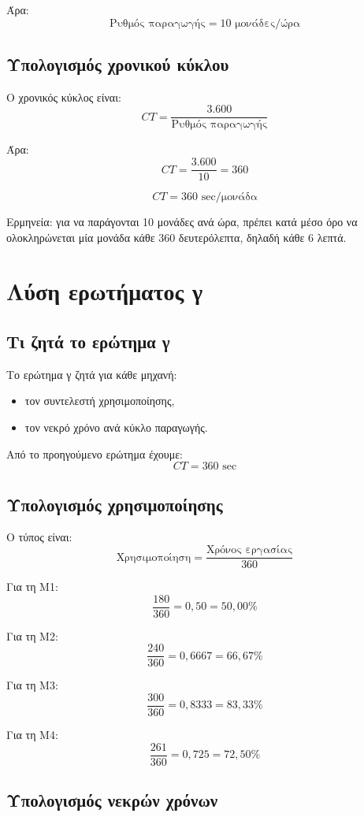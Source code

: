 \documentclass[12pt,a4paper]{article}
\begin{document}
Άρα:
\[
\boxed{\text{Ρυθμός παραγωγής}=10 \text{ μονάδες/ώρα}}
\]

\subsection{Υπολογισμός χρονικού κύκλου}

Ο χρονικός κύκλος είναι:
\[
CT=\frac{3.600}{\text{Ρυθμός παραγωγής}}
\]

Άρα:
\[
CT=\frac{3.600}{10}=360
\]

\[
\boxed{CT=360 \text{ sec/μονάδα}}
\]

Ερμηνεία: για να παράγονται 10 μονάδες ανά ώρα, πρέπει κατά μέσο όρο να ολοκληρώνεται μία μονάδα κάθε 360 δευτερόλεπτα, δηλαδή κάθε 6 λεπτά.

\section{Λύση ερωτήματος γ}

\subsection{Τι ζητά το ερώτημα γ}

Το ερώτημα γ ζητά για κάθε μηχανή:

\begin{itemize}
    \item τον συντελεστή χρησιμοποίησης,
    \item τον νεκρό χρόνο ανά κύκλο παραγωγής.
\end{itemize}

Από το προηγούμενο ερώτημα έχουμε:
\[
CT=360 \text{ sec}
\]

\subsection{Υπολογισμός χρησιμοποίησης}

Ο τύπος είναι:
\[
\text{Χρησιμοποίηση}=
\frac{\text{Χρόνος εργασίας}}{360}
\]

Για τη Μ1:
\[
\frac{180}{360}=0{,}50=50{,}00\%
\]

Για τη Μ2:
\[
\frac{240}{360}=0{,}6667=66{,}67\%
\]

Για τη Μ3:
\[
\frac{300}{360}=0{,}8333=83{,}33\%
\]

Για τη Μ4:
\[
\frac{261}{360}=0{,}725=72{,}50\%
\]

\subsection{Υπολογισμός νεκρών χρόνων}
\end{document}
